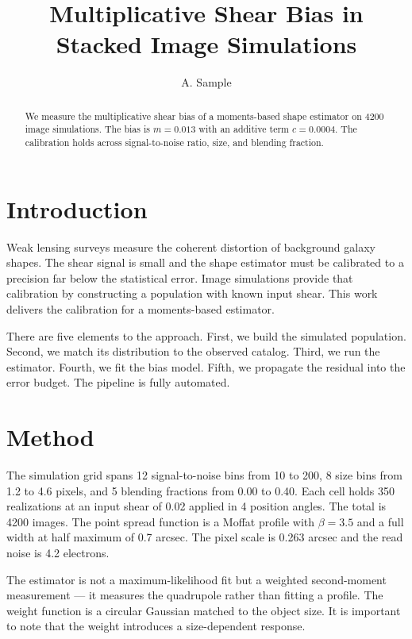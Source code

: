 \documentclass{article}
\newcommand{\Nsims}{4200}
\newcommand{\mbias}{0.013}
\newcommand{\cbias}{0.0004}
\begin{document}
\title{Multiplicative Shear Bias in Stacked Image Simulations}
\author{A. Sample}
\maketitle

\begin{abstract}
We measure the multiplicative shear bias of a moments-based shape estimator on
\Nsims{} image simulations. The bias is $m = \mbias$ with an additive term
$c = \cbias$. The calibration holds across signal-to-noise ratio, size, and
blending fraction.
\end{abstract}

\section{Introduction}

Weak lensing surveys measure the coherent distortion of background galaxy
shapes. The shear signal is small and the shape estimator must be calibrated to
a precision far below the statistical error. Image simulations provide that
calibration by constructing a population with known input shear. This work
delivers the calibration for a moments-based estimator.

There are five elements to the approach. First, we build the simulated
population. Second, we match its distribution to the observed catalog. Third,
we run the estimator. Fourth, we fit the bias model. Fifth, we propagate the
residual into the error budget. The pipeline is fully automated.

\section{Method}

The simulation grid spans 12 signal-to-noise bins from 10 to 200, 8 size bins
from 1.2 to 4.6 pixels, and 5 blending fractions from 0.00 to 0.40. Each cell
holds 350 realizations at an input shear of 0.02 applied in 4 position angles.
The total is \Nsims{} images. The point spread function is a Moffat profile
with $\beta = 3.5$ and a full width at half maximum of 0.7 arcsec. The pixel
scale is 0.263 arcsec and the read noise is 4.2 electrons.

The estimator is not a maximum-likelihood fit but a weighted second-moment
measurement --- it measures the quadrupole rather than fitting a profile. The
weight function is a circular Gaussian matched to the object size. It is
important to note that the weight introduces a size-dependent response.
\end{document}
